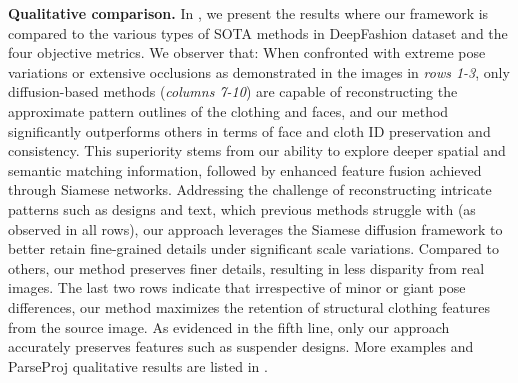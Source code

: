 \textbf{Qualitative comparison.}
In , we present the results where our framework is compared to the various types of SOTA methods in DeepFashion dataset and the four objective metrics. 
%
We observer that: 
 When confronted with extreme pose variations or extensive occlusions as demonstrated in the images in \textit{rows 1-3}, only diffusion-based methods (\textit{columns 7-10}) are capable of reconstructing the approximate pattern outlines of the clothing and faces, and our method significantly outperforms others in terms of face and cloth ID preservation and consistency. This superiority stems from our ability to explore deeper spatial and semantic matching information, followed by enhanced feature fusion achieved through Siamese networks. 
 Addressing the challenge of reconstructing intricate patterns such as designs and text, which previous methods struggle with (as observed in all rows), our approach leverages the Siamese diffusion framework to better retain fine-grained details under significant scale variations. Compared to others, our method preserves finer details, resulting in less disparity from real images.
 The last two rows indicate that irrespective of minor or giant pose differences, our method maximizes the retention of structural clothing features from the source image. As evidenced in the fifth line, only our approach accurately preserves features such as suspender designs.
More examples and ParseProj qualitative results are listed in .

